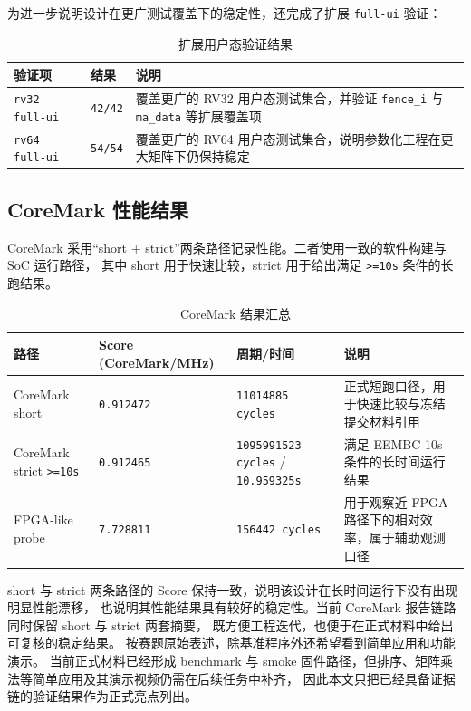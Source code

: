 为进一步说明设计在更广测试覆盖下的稳定性，还完成了扩展 \texttt{full-ui} 验证：
\begin{table}[H]
    \centering
    \small
    \caption{扩展用户态验证结果}
    \begin{tabularx}{0.92\textwidth}{L{0.26\textwidth} L{0.18\textwidth} Y}
        \toprule
        验证项 & 结果 & 说明 \\
        \midrule
        \texttt{rv32 full-ui} & \texttt{42/42} & 覆盖更广的 RV32 用户态测试集合，并验证 \texttt{fence\_i} 与 \texttt{ma\_data} 等扩展覆盖项 \\
        \texttt{rv64 full-ui} & \texttt{54/54} & 覆盖更广的 RV64 用户态测试集合，说明参数化工程在更大矩阵下仍保持稳定 \\
        \bottomrule
    \end{tabularx}
\end{table}

\subsection{CoreMark 性能结果}

CoreMark 采用“short + strict”两条路径记录性能。二者使用一致的软件构建与 SoC 运行路径，
其中 short 用于快速比较，strict 用于给出满足 \texttt{>=10s} 条件的长跑结果。
\begin{table}[H]
    \centering
    \small
    \caption{CoreMark 结果汇总}
    \begin{tabularx}{0.95\textwidth}{L{0.23\textwidth} L{0.16\textwidth} L{0.22\textwidth} Y}
        \toprule
        路径 & Score (CoreMark/MHz) & 周期/时间 & 说明 \\
        \midrule
        CoreMark short & \texttt{0.912472} & \texttt{11014885 cycles} & 正式短跑口径，用于快速比较与冻结提交材料引用 \\
        CoreMark strict \texttt{>=10s} & \texttt{0.912465} & \texttt{1095991523 cycles} / \texttt{10.959325s} & 满足 EEMBC 10s 条件的长时间运行结果 \\
        FPGA-like probe & \texttt{7.728811} & \texttt{156442 cycles} & 用于观察近 FPGA 路径下的相对效率，属于辅助观测口径 \\
        \bottomrule
    \end{tabularx}
\end{table}

short 与 strict 两条路径的 Score 保持一致，说明该设计在长时间运行下没有出现明显性能漂移，
也说明其性能结果具有较好的稳定性。当前 CoreMark 报告链路同时保留 short 与 strict 两套摘要，
既方便工程迭代，也便于在正式材料中给出可复核的稳定结果。
按赛题原始表述，除基准程序外还希望看到简单应用和功能演示。
当前正式材料已经形成 benchmark 与 smoke 固件路径，但排序、矩阵乘法等简单应用及其演示视频仍需在后续任务中补齐，
因此本文只把已经具备证据链的验证结果作为正式亮点列出。

